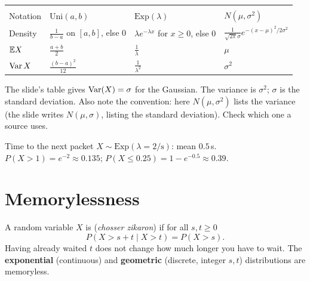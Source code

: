 \begin{center}
\renewcommand{\arraystretch}{1.4}
\begin{tabular}{>{}l L{3.6cm} L{3.6cm} L{4.2cm}}
 &  &  & \\
\color{surface}Notation & $\text{Uni}(a,b)$ & $\text{Exp}(\lambda)$ & $N(\mu,\sigma^2)$\\
\color{surface}Density & $\frac1{b-a}$ on $[a,b]$, else $0$ & $\lambda e^{-\lambda x}$ for $x\ge0$, else $0$ & $\frac{1}{\sqrt{2\pi}\sigma}e^{-(x-\mu)^2/2\sigma^2}$\\
\color{surface}$\mathbb{E} X$ & $\frac{a+b}2$ & $\frac1\lambda$ & $\mu$\\
\color{surface}$\operatorname{Var} X$ & $\frac{(b-a)^2}{12}$ & $\frac1{\lambda^2}$ & $\sigma^2$\\
\end{tabular}
\end{center}

\begin{pitfall}
The slide's table gives $\operatorname{Var}(X)=\sigma$ for the Gaussian. The variance is \textbf{$\sigma^2$}; $\sigma$ is the standard deviation. Also note the
convention: here $N(\mu,\sigma^2)$ lists the variance (the slide writes $N(\mu,\sigma)$, listing the standard deviation). Check which one a source uses.
\end{pitfall}

\begin{example}
Time to the next packet $X\sim\text{Exp}(\lambda=2/\text{s})$: mean $0.5$\,s. $P(X>1)=e^{-2}\approx0.135$; $P(X\le0.25)=1-e^{-0.5}\approx0.39$.
\end{example}

\section{Memorylessness}

\begin{defn}[Memoryless]
A random variable $X$ is  (\emph{chosser zikaron}) if for all $s,t\ge0$
\[ P(X>s+t\mid X>t)=P(X>s). \]
Having already waited $t$ does not change how much longer you have to wait. The \textbf{exponential} (continuous) and \textbf{geometric} (discrete, integer $s,t$) distributions are memoryless.
\end{defn}

